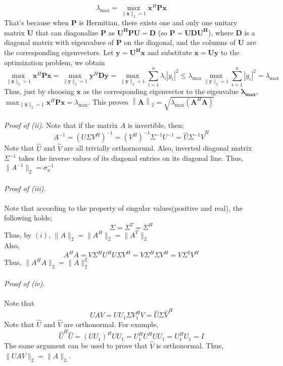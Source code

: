 \documentclass[letterpaper,12pt]{article}
\theoremstyle{definition}
\begin{document}
\[\lambda_{\max} = \max_{\| \mathbf{x} \|_2=1} \mathbf{x}^H \mathbf{Px}\]
That's because when $\mathbf{P}$ is Hermitian, there exists one and only one unitary matrix $\mathbf{U}$ that can diagonalize $\mathbf{P}$ as $\mathbf{U^HPU=D}$ (so $\mathbf{P=UDU^H}$), where $\mathbf{D}$ is a diagonal matrix with eigenvalues of $\mathbf{P}$ on the diagonal, and the columns of $\mathbf{U}$ are the corresponding eigenvectors. Let $\mathbf{y=U^H x}$ and substitute $\mathbf{x=Uy}$ to the optimization problem, we obtain
\[ \max_{\| \mathbf{x} \|_2=1} \mathbf{x}^H \mathbf{Px} = \max_{\| \mathbf{y} \|_2=1} \mathbf{y}^H \mathbf{Dy} = \max_{\| \mathbf{y} \|_2=1} \sum_{i=1}^n \lambda_i |y_i|^2 \le \lambda_{\max} \max_{\| \mathbf{y} \|_2=1} \sum_{i=1}^n |y_i|^2 = \lambda_{\max}\]
Thus, just by choosing $\mathbf{x}$ as the corresponding eigenvector to the eigenvalue $\mathbf{\lambda_{max}}$, \\
$\max_{\| \mathbf{x} \|_2=1} \mathbf{x}^H \mathbf{Px} = \lambda_{\max}$. This proves $\left\| \mathbf{A}\right\|_2 = \sqrt{\lambda_{\max}(\mathbf{A}^H \mathbf{A})}$ \\\\
\emph{Proof of (ii). } Note that if the matrix $A$ is invertible, then;
\[A^{-1} = (U \Sigma V^H)^{-1} = (V^H)^{-1} \Sigma^{-1} U^{-1} = \hat{U} \Sigma^{-1} \hat{V}^H \]
Note that $\hat{U}$ and $\hat{V}$ are all trivially orthornormal. Also, inverted diagonal matrix $\Sigma^{-1}$ takes the inverse values of its diagonal entries on its diagonal line. Thus, $\|A^{-1}\|_2 = \sigma_{n}^{-1} $ \\\\
\emph{Proof of (iii). } \\\\
Note that according to the property of singular values(positive and real), the following holds;
\[\Sigma = \Sigma^T = \Sigma^H \]
Thus, by $(i)$, $\|A\|_2 = \|A^H\|_2 = \|A^T\|_2$ \\
Also,
\[A^H A = V \Sigma^H U^H U \Sigma V^H = V \Sigma^H \Sigma V^H = V \Sigma^2 V^H\]
Thus, $\|A^H A\|_2 = \|A\|_{2}^{2}$ \\\\
\emph{Proof of (iv).} \\\\
Note that
\[UAV = U U_1 \Sigma V_{1}^H V = \hat{U} \Sigma \hat{V}^H\]
Note that $\hat{U}$ and $\hat{V}$ are orthonormal. For example,
\[\hat{U}^H \hat{U} = (U U_1)^H U U_1 = U_{1}^H U^H U U_1 = U_{1}^H U_1 = I\]
The same argument can be used to prove that $\hat{V}$ is orthonormal. Thus, $\|UAV\|_2 = \|A\|_2$.
\end{document}
